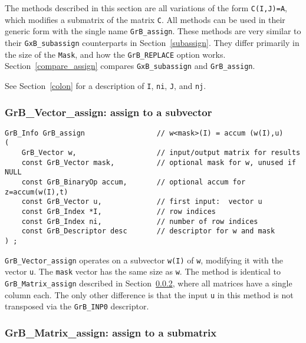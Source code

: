 \documentclass[12pt]{article}
\begin{document}
{The methods described in this section are all variations of the form
\verb'C(I,J)=A', which modifies a submatrix of the matrix \verb'C'.  All
methods can be used in their generic form with the single name
\verb'GrB_assign'.  These methods are very similar to their
\verb'GxB_subassign' counterparts in Section~\ref{subassign}.  They differ
primarily in the size of the \verb'Mask', and how the \verb'GrB_REPLACE' option
works.  Section~\ref{compare_assign} compares
\verb'GxB_subassign' and \verb'GrB_assign'.

See Section~\ref{colon} for a description of
\verb'I', \verb'ni', \verb'J', and \verb'nj'.

\subsubsection{{\sf GrB\_Vector\_assign:} assign to a subvector }
\label{assign_vector}

\begin{mdframed}[userdefinedwidth=6in]
{\footnotesize
\begin{verbatim}
GrB_Info GrB_assign                 // w<mask>(I) = accum (w(I),u)
(
    GrB_Vector w,                   // input/output matrix for results
    const GrB_Vector mask,          // optional mask for w, unused if NULL
    const GrB_BinaryOp accum,       // optional accum for z=accum(w(I),t)
    const GrB_Vector u,             // first input:  vector u
    const GrB_Index *I,             // row indices
    const GrB_Index ni,             // number of row indices
    const GrB_Descriptor desc       // descriptor for w and mask
) ;
\end{verbatim} } \end{mdframed}

\verb'GrB_Vector_assign' operates on a subvector \verb'w(I)' of \verb'w',
modifying it with the vector \verb'u'.  The \verb'mask' vector has the same
size as \verb'w'.  The method is identical to \verb'GrB_Matrix_assign'
described in Section~\ref{assign_matrix}, where all matrices have a single
column each.  The only other difference is that the input \verb'u' in this
method is not transposed via the \verb'GrB_INP0' descriptor.

\newpage
\subsubsection{{\sf GrB\_Matrix\_assign:} assign to a submatrix }
\label{assign_matrix}

}
\end{document}
